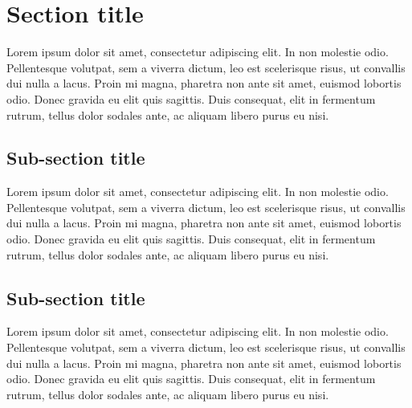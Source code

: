 \documentclass[12pt]{report}
\begin{document}
\section{Section title}
Lorem ipsum dolor sit amet, consectetur adipiscing elit. In non molestie odio. Pellentesque volutpat, sem a viverra dictum, leo est scelerisque risus, ut convallis dui nulla a lacus. Proin mi magna, pharetra non ante sit amet, euismod lobortis odio. Donec gravida eu elit quis sagittis. Duis consequat, elit in fermentum rutrum, tellus dolor sodales ante, ac aliquam libero purus eu nisi. 

\subsection{Sub-section title}
Lorem ipsum dolor sit amet, consectetur adipiscing elit. In non molestie odio. Pellentesque volutpat, sem a viverra dictum, leo est scelerisque risus, ut convallis dui nulla a lacus. Proin mi magna, pharetra non ante sit amet, euismod lobortis odio. Donec gravida eu elit quis sagittis. Duis consequat, elit in fermentum rutrum, tellus dolor sodales ante, ac aliquam libero purus eu nisi.

\subsection{Sub-section title}
Lorem ipsum dolor sit amet, consectetur adipiscing elit. In non molestie odio. Pellentesque volutpat, sem a viverra dictum, leo est scelerisque risus, ut convallis dui nulla a lacus. Proin mi magna, pharetra non ante sit amet, euismod lobortis odio. Donec gravida eu elit quis sagittis. Duis consequat, elit in fermentum rutrum, tellus dolor sodales ante, ac aliquam libero purus eu nisi.
\end{document}
